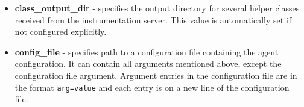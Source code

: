 \documentclass[12pt,a4paper]{report}
\begin{document}
\begin{itemize}
	\item \textbf{class\_output\_dir} - specifies the output directory for several helper classes received from the instrumentation server. This value is automatically set if not configured explicitly.
	\item \textbf{config\_file} - specifies path to a configuration file containing the agent configuration. It can contain all arguments mentioned above, except the configuration file argument. Argument entries in the configuration file are in the format \texttt{arg=value} and each entry is on a new line of the configuration file. 
\end{itemize}
\end{document}
